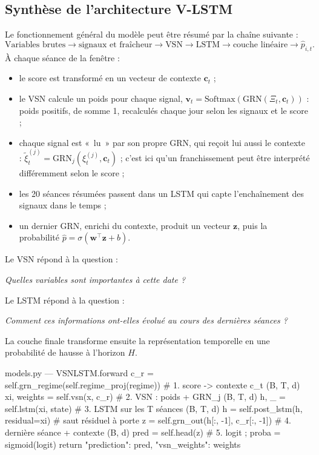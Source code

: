 \documentclass[11pt,a4paper]{article}
\renewcommand{\_}{\usorig\allowbreak}   %
\begin{document}
\subsection{Synthèse de l'architecture V-LSTM}
Le fonctionnement général du modèle peut être résumé par la chaîne suivante :
\[
  \text{Variables brutes}\longrightarrow\text{signaux et fraîcheur}\longrightarrow\text{VSN}
  \longrightarrow\text{LSTM}\longrightarrow\text{couche linéaire}\longrightarrow\hat p_{i,t}.
\]
À chaque séance de la fenêtre :
\begin{itemize}[nosep,label=-]
  \item le score est transformé en un vecteur de contexte $\bm c_t$ ;
  \item le VSN calcule un poids pour chaque signal, $\bm v_t = \mathrm{Softmax}(\mathrm{GRN}(\Xi_t,\bm c_t))$ :
  poids positifs, de somme 1, recalculés chaque jour selon les signaux et le score ;
  \item chaque signal est «~lu~» par son propre GRN, qui reçoit lui aussi le contexte :
  $\tilde\xi^{(j)}_{t} = \mathrm{GRN}_j(\xi^{(j)}_{t},\bm c_t)$ ; c'est ici qu'un franchissement
  peut être interprété différemment selon le score ;
  \item les 20 séances résumées passent dans un LSTM qui capte l'enchaînement des signaux
  dans le temps ;
  \item un dernier GRN, enrichi du contexte, produit un vecteur $\bm z$, puis la probabilité
  $\hat p = \sigma(\bm w^\top\bm z + b)$.
\end{itemize}
Le VSN répond à la question :
\begin{center}\emph{Quelles variables sont importantes à cette date ?}\end{center}
Le LSTM répond à la question :
\begin{center}\emph{Comment ces informations ont-elles évolué au cours des dernières séances ?}\end{center}
La couche finale transforme ensuite la représentation temporelle en une probabilité de
hausse à l'horizon $H$.

\begin{code}{models.py --- VSNLSTM.forward}
c_r = self.grn_regime(self.regime_proj(regime))   # 1. score -> contexte c_t        (B, T, d)
xi, weights = self.vsn(x, c_r)                    # 2. VSN : poids + GRN_j          (B, T, d)
h, _ = self.lstm(xi, state)                       # 3. LSTM sur les T séances       (B, T, d)
h = self.post_lstm(h, residual=xi)                #    saut résiduel à porte
z = self.grn_out(h[:, -1], c_r[:, -1])            # 4. dernière séance + contexte   (B, d)
pred = self.head(z)                               # 5. logit ; proba = sigmoid(logit)
return {"prediction": pred, "vsn_weights": weights}
\end{code}
\end{document}
